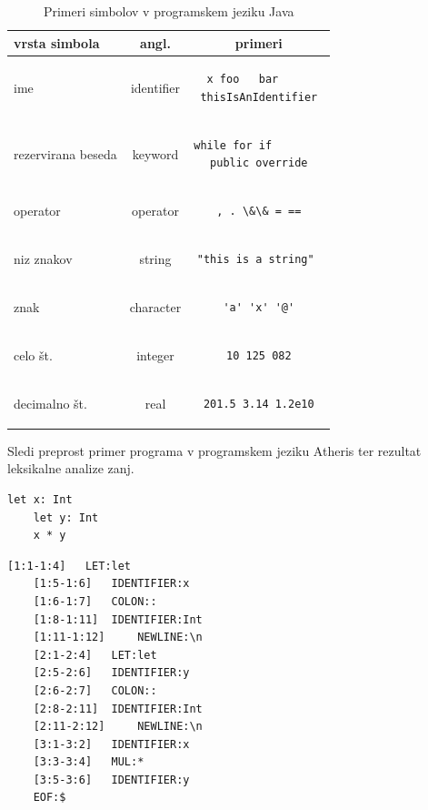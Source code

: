 \documentclass[a4paper, 12p]{book}
\begin{document}
\begin{table}
	\begin{center}
		\begin{tabular}{l|c|c}
			\textbf{vrsta simbola} & \textbf{angl.} & \textbf{primeri} \\ \hline\hline
			ime & identifier & 
\begin{lstlisting} 
x foo	bar		
thisIsAnIdentifier
\end{lstlisting} \\
			rezervirana beseda & keyword & 
\begin{lstlisting} 
while for if		
public override
\end{lstlisting} \\
			operator & operator & 
\begin{lstlisting} 
, . \&\& = ==
\end{lstlisting} \\
			niz znakov & string & 
\begin{lstlisting} 
"this is a string" 
\end{lstlisting} \\
			znak & character &
\begin{lstlisting} 
'a' 'x' '@'
\end{lstlisting} \\
			celo št. & integer &
\begin{lstlisting} 
10 125 082
\end{lstlisting} \\
			decimalno št. & real &
\begin{lstlisting} 
201.5 3.14 1.2e10
\end{lstlisting} \\
		\end{tabular}
	\end{center}
	\caption{Primeri simbolov v programskem jeziku Java}
	\label{tabel:vrsteZetonov}
\end{table}

Sledi preprost primer programa v programskem jeziku Atheris ter rezultat leksikalne analize zanj.

\renewcommand{\lstlistingname}{Program}
\begin{lstlisting}[caption={Primer programa v programskem jeziku Atheris},label={lst:atherisCode}, captionpos=b]
	let x: Int
	let y: Int
	x * y
\end{lstlisting}

\renewcommand{\lstlistingname}{Izpis}
\begin{lstlisting}[caption={Rezultat leksikalne analize za program ~\ref{lst:atherisCode}},label={lst:lexedSource},captionpos=b]
	[1:1-1:4] 	LET:let
	[1:5-1:6] 	IDENTIFIER:x
	[1:6-1:7] 	COLON::
	[1:8-1:11] 	IDENTIFIER:Int
	[1:11-1:12] 	NEWLINE:\n
	[2:1-2:4] 	LET:let
	[2:5-2:6] 	IDENTIFIER:y
	[2:6-2:7] 	COLON::
	[2:8-2:11] 	IDENTIFIER:Int
	[2:11-2:12] 	NEWLINE:\n
	[3:1-3:2] 	IDENTIFIER:x
	[3:3-3:4] 	MUL:*
	[3:5-3:6] 	IDENTIFIER:y
	EOF:$
\end{lstlisting}
\end{document}
